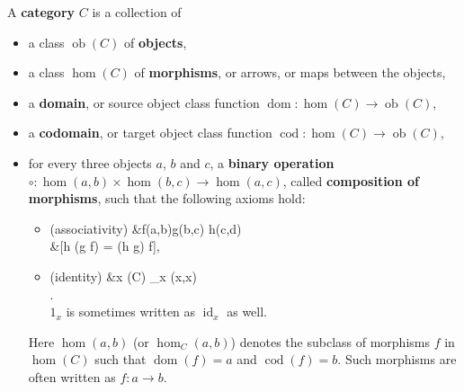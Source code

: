 \documentclass[12pt, letterpaper]{article}
\newcommand{\ob}{\operatorname{ob}}
\newcommand{\dom}{\operatorname{dom}}
\newcommand{\cod}{\operatorname{cod}}
\newcommand{\idt}{\operatorname{id}}
\newenvironment{eqlong}{\equation\aligned}{\endaligned\endequation}
\theoremstyle{definition}
\theoremstyle{remark}
\theoremstyle{definition}
\theoremstyle{plain}
\numberwithin{equation}{section}
\begin{document}
	\begin{def*}[category]
		A \textbf{category} $C$ is a collection of
		\begin{itemize}			
			\item a class $\ob(C)$ of \textbf{objects},
			\item a class $\hom(C)$ of \textbf{morphisms}, or arrows, or maps between the objects,
			\item a \textbf{domain}, or source object class function $\dom \colon \hom(C)\to\ob(C)$,
			\item a \textbf{codomain}, or target object class function 
			$\cod \colon \hom(C)\to\ob(C)$,
			\item for every three objects $a$, $b$ and $c$, a \textbf{binary operation} $
			\circ\colon\hom(a, b) \times \hom(b, c) \to \hom(a, c)$, called \textbf{composition of morphisms},
			such that the following axioms hold:
			\begin{itemize}
				\item (associativity)
				\begin{eqlong}
					&\forall f\in \hom(a,b)\forall g\in \hom(b,c) \forall h\in\hom(c,d)\\
					&[h \circ (g \circ f) = (h \circ g) \circ f],\\
				\end{eqlong}\[\]
				\item (identity) 
				\begin{eqlong}
					&\forall x \in \ob(C) _x \in \hom(x,x)\\
					[&\forall a\in \ob(C)\forall f \in \hom(a,x)(1_x\circ f =f)\\
					\land &
					\forall b \in \ob(C)\forall g\in \hom(x,b) (g \circ 1_x = g )].\\
				\end{eqlong}
				$1_x$ is sometimes written as $\idt_x$ as well.
			\end{itemize}			
			Here $\hom(a, b)$ (or $\hom_C(a,b)$) denotes the subclass of morphisms $f$ in $\hom(C)$
			such that $\dom(f)=a$ and $\cod(f)=b$.
			Such morphisms are often written as $f\colon a \to b$.
		\end{itemize}
	\end{def*}
\end{document}
